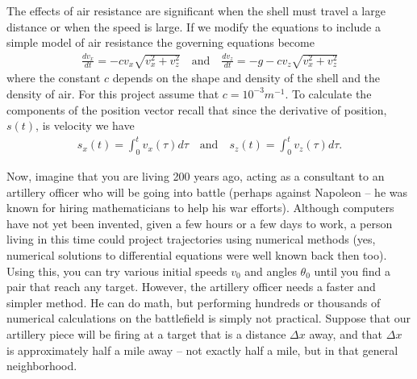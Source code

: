 \documentclass[
]{book}
\theoremstyle{definition}
\theoremstyle{definition}
\theoremstyle{definition}
\theoremstyle{remark}
\begin{document}
The effects of air resistance are significant when the shell must travel
a large distance or when the speed is large. If we modify
the equations to include a simple model of air resistance
the governing equations become \[\begin{aligned}
    \frac{dv_x}{dt} = -c v_x \sqrt{ v_x^2 + v_z^2} \quad \text{and} \quad
    \frac{dv_z}{dt} = -g - cv_z \sqrt{ v_x^2 + v_z^2}
    \label{eqn:with-air-res}\end{aligned}\] where the constant \(c\)
depends on the shape and density of the shell and the density of air.
For this project assume that \(c = 10^{-3} m^{-1}\). To calculate the
components of the position vector recall that since the derivative of
position, \(s(t)\), is velocity we have \[\begin{aligned}
    s_x(t) = \int_0^t v_x(\tau) d\tau \quad \text{and} \quad s_z(t) = \int_0^t v_z(\tau)
    d\tau.\end{aligned}\]

Now, imagine that you are living 200 years ago, acting as a consultant
to an artillery officer who will be going into battle (perhaps against
Napoleon -- he was known for hiring mathematicians to help his war
efforts). Although computers have not yet been invented, given a few
hours or a few days to work, a person living in this time could project
trajectories using numerical methods (yes, numerical solutions to
differential equations were well known back then too). Using this, you
can try various initial speeds \(v_0\) and angles \(\theta_0\) until you
find a pair that reach any target. However, the artillery officer needs
a faster and simpler method. He can do math, but performing hundreds or
thousands of numerical calculations on the battlefield is simply not
practical. Suppose that our artillery piece will be firing at a target
that is a distance \(\Delta x\) away, and that \(\Delta x\) is approximately
half a mile away -- not exactly half a mile, but in that general
neighborhood.
\end{document}

